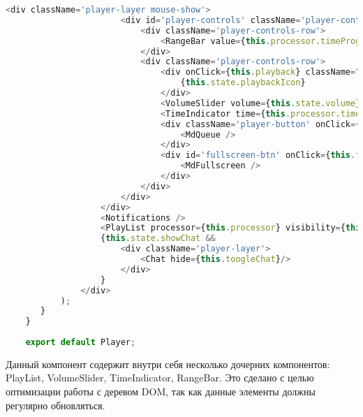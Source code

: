 \begin{lstlisting}[language=JavaScript,label={lst:player},caption={Компонент Player}]
                   <div className='player-layer mouse-show'>
                       <div id='player-controls' className='player-controls'>
                           <div className='player-controls-row'>
                               <RangeBar value={this.processor.timeProgress} handle_change={this.setTime} style={{ 'margin-top': '5px', 'margin-bottom': '5px' }} />
                           </div>
                           <div className='player-controls-row'>
                               <div onClick={this.playback} className="player-button player-button-play">
                                   {this.state.playbackIcon}
                               </div>
                               <VolumeSlider volume={this.state.volume} volumeHandler={this.setVolume} toggleMute={this.changeMute} />
                               <TimeIndicator time={this.processor.time} duration={this.processor.duration} />
                               <div className='player-button' onClick={this.togglePlaylist}>
                                   <MdQueue />
                               </div>
                               <div id='fullscreen-btn' onClick={this.fullscreen} className="player-button player-button-fullscreen">
                                   <MdFullscreen />
                               </div>
                           </div>
                       </div>
                   </div>
                   <Notifications />
                   <PlayList processor={this.processor} visibility={this.state.playlist} playlistLogic={this.props.playlistLogic} libraryLogic={this.props.libraryLogic} toogleVideoChooser={this.toogleVideoChooser} />
                   {this.state.showChat &&
                       <div className='player-layer'>
                           <Chat hide={this.toogleChat}/>
                       </div>
                   }
               </div>
           );
       }
    }
     
    export default Player;
\end{lstlisting}

Данный компонент содержит внутри себя несколько дочерних компонентов: PlayList, VolumeSlider, TimeIndicator, RangeBar. 
Это сделано с целью оптимизации работы с деревом DOM, так как данные элементы должны регулярно обновляться.

